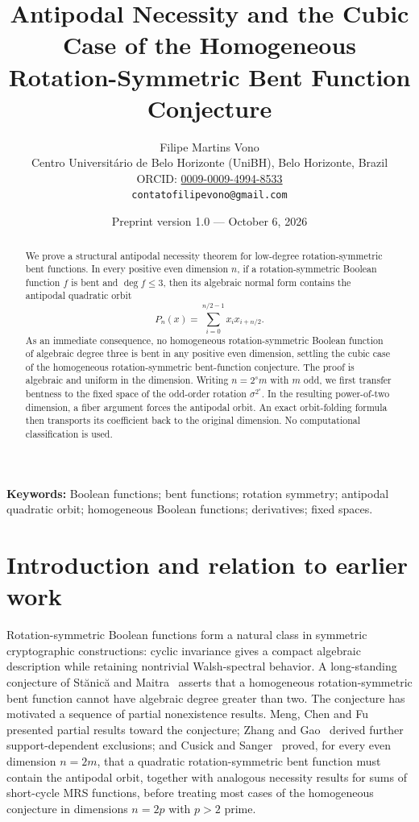 \documentclass[11pt,a4paper]{article}
\title{Antipodal Necessity and the Cubic Case of the Homogeneous Rotation-Symmetric Bent Function Conjecture}
\author{Filipe Martins Vono\\
\small Centro Universit\'ario de Belo Horizonte (UniBH), Belo Horizonte, Brazil\\
\small ORCID: \href{https://orcid.org/0009-0009-4994-8533}{0009-0009-4994-8533}\\
\small \texttt{contatofilipevono@gmail.com}}
\date{Preprint version 1.0 --- October 6, 2026}
\theoremstyle{remark}
\theoremstyle{plain}
\begin{document}
\maketitle
\begin{abstract}
We prove a structural antipodal necessity theorem for low-degree rotation-symmetric bent functions. In every positive even dimension $n$, if a rotation-symmetric Boolean function $f$ is bent and $\deg f\le3$, then its algebraic normal form contains the antipodal quadratic orbit
\[
P_n(x)=\sum_{i=0}^{n/2-1}x_i x_{i+n/2}.
\]
As an immediate consequence, no homogeneous rotation-symmetric Boolean function of algebraic degree three is bent in any positive even dimension, settling the cubic case of the homogeneous rotation-symmetric bent-function conjecture. The proof is algebraic and uniform in the dimension. Writing $n=2^s m$ with $m$ odd, we first transfer bentness to the fixed space of the odd-order rotation $\sigma^{2^s}$. In the resulting power-of-two dimension, a fiber argument forces the antipodal orbit. An exact orbit-folding formula then transports its coefficient back to the original dimension. No computational classification is used.
\end{abstract}
\noindent\textbf{Keywords:} Boolean functions; bent functions; rotation symmetry; antipodal quadratic orbit; homogeneous Boolean functions; derivatives; fixed spaces.

\section{Introduction and relation to earlier work}
Rotation-symmetric Boolean functions form a natural class in symmetric cryptographic constructions: cyclic invariance gives a compact algebraic description while retaining nontrivial Walsh-spectral behavior. A long-standing conjecture of St\u{a}nic\u{a} and Maitra~\cite{stanica} asserts that a homogeneous rotation-symmetric bent function cannot have algebraic degree greater than two. The conjecture has motivated a sequence of partial nonexistence results. Meng, Chen and Fu~\cite{meng} presented partial results toward the conjecture; Zhang and Gao~\cite{zhang} derived further support-dependent exclusions; and Cusick and Sanger~\cite{cusick} proved, for every even dimension $n=2m$, that a quadratic rotation-symmetric bent function must contain the antipodal orbit, together with analogous necessity results for sums of short-cycle MRS functions, before treating most cases of the homogeneous conjecture in dimensions $n=2p$ with $p>2$ prime.
\end{document}
